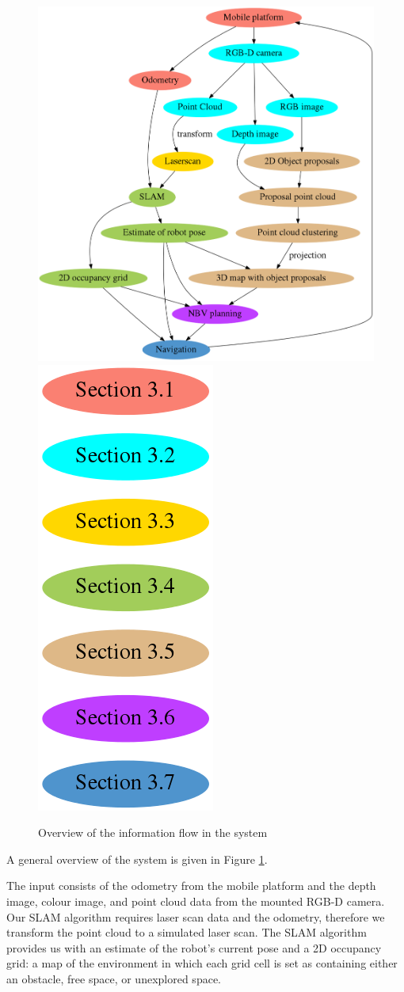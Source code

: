 \begin{figure}[ht]
	\begin{center}
		\includegraphics[width=0.82\linewidth]{dot/overview.png} 
		\includegraphics[width=0.17\linewidth]{dot/legend.png} 
		\caption{Overview of the information flow in the system}
		\label{fig:overview}
	\end{center}
\end{figure}

A general overview of the system is given in Figure \ref{fig:overview}.

The input consists of the odometry from the mobile platform and the depth image, colour image, and point cloud data from the mounted RGB-D camera.
Our SLAM algorithm requires laser scan data and the odometry, therefore we transform the point cloud to a simulated laser scan.
The SLAM algorithm provides us with an estimate of the robot's current pose and a 2D occupancy grid: a map of the environment in which each grid cell is set as containing either an obstacle, free space, or unexplored space. 

